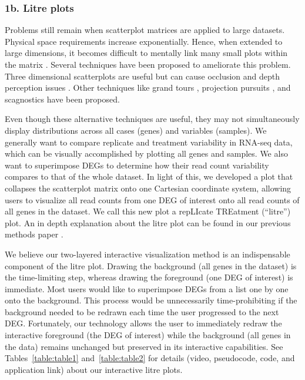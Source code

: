 \documentclass[parskip=full]{bmcart} %
\begin{document}
\subsubsection*{1b. Litre plots}

Problems still remain when scatterplot matrices are applied to large datasets. Physical space requirements increase exponentially. Hence, when extended to large dimensions, it becomes difficult to mentally link many small plots within the matrix \cite{kerren2007human}. Several techniques have been proposed to ameliorate this problem. Three dimensional scatterplots are useful but can cause occlusion and depth perception issues \cite{kerren2007human}. Other techniques like grand tours \cite{asimov1985grand}, projection pursuits \cite{friedman1974projection, cook1995grand}, and scagnostics \cite{wilkinson2005graph} have been proposed.

Even though these alternative techniques are useful, they may not simultaneously display distributions across all cases (genes) and variables (samples). We generally want to compare replicate and treatment variability in RNA-seq data, which can be visually accomplished by plotting all genes and samples. We also want to superimpose DEGs to determine how their read count variability compares to that of the whole dataset. In light of this, we developed a plot that collapses the scatterplot matrix onto one Cartesian coordinate system, allowing users to visualize all read counts from one DEG of interest onto all read counts of all genes in the dataset. We call this new plot a repLIcate TREatment (``litre'') plot. An in depth explanation about the litre plot can be found in our previous methods paper \cite{rutter1}.

We believe our two-layered interactive visualization method is an indispensable component of the litre plot. Drawing the background (all genes in the dataset) is the time-limiting step, whereas drawing the foreground (one DEG of interest) is immediate. Most users would like to superimpose DEGs from a list one by one onto the background. This process would be unnecessarily time-prohibiting if the background needed to be redrawn each time the user progressed to the next DEG. Fortunately, our technology allows the user to immediately redraw the interactive foreground (the DEG of interest) while the background (all genes in the data) remains unchanged but preserved in its interactive capabilities. See Tables~\ref{table:table1} and~\ref{table:table2} for details (video, pseudocode, code, and application link) about our interactive litre plots.
\end{document}
